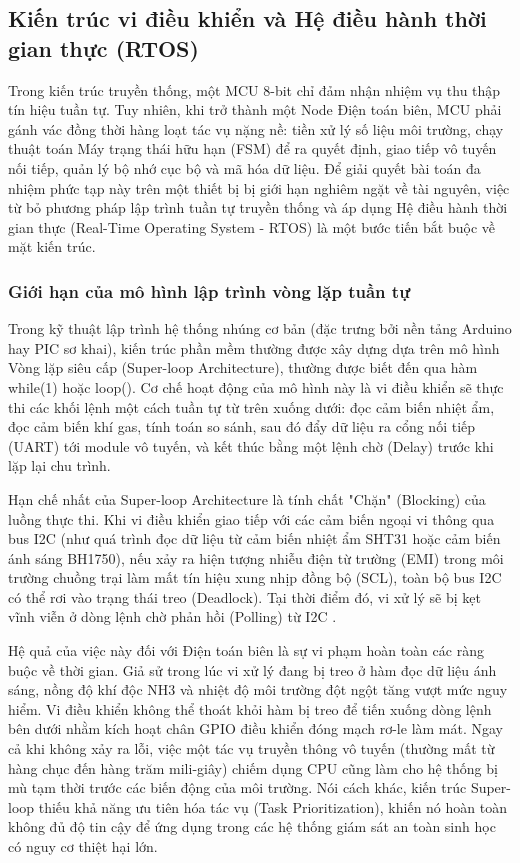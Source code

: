 \subsection{Kiến trúc vi điều khiển và Hệ điều hành thời gian thực (RTOS)}
Trong kiến trúc truyền thống, một MCU 8-bit chỉ đảm nhận nhiệm vụ thu thập tín hiệu tuần tự. Tuy nhiên, khi trở thành một Node Điện toán biên, MCU phải gánh vác đồng thời hàng loạt tác vụ nặng nề: tiền xử lý số liệu môi trường, chạy thuật toán Máy trạng thái hữu hạn (FSM) để ra quyết định, giao tiếp vô tuyến nối tiếp, quản lý bộ nhớ cục bộ và mã hóa dữ liệu. Để giải quyết bài toán đa nhiệm phức tạp này trên một thiết bị bị giới hạn nghiêm ngặt về tài nguyên, việc từ bỏ phương pháp lập trình tuần tự truyền thống và áp dụng Hệ điều hành thời gian thực (Real-Time Operating System - RTOS) là một bước tiến bắt buộc về mặt kiến trúc.
\subsubsection{Giới hạn của mô hình lập trình vòng lặp tuần tự}
Trong kỹ thuật lập trình hệ thống nhúng cơ bản (đặc trưng bởi nền tảng Arduino hay PIC sơ khai), kiến trúc phần mềm thường được xây dựng dựa trên mô hình Vòng lặp siêu cấp (Super-loop Architecture), thường được biết đến qua hàm while(1) hoặc loop(). Cơ chế hoạt động của mô hình này là vi điều khiển sẽ thực thi các khối lệnh một cách tuần tự từ trên xuống dưới: đọc cảm biến nhiệt ẩm, đọc cảm biến khí gas, tính toán so sánh, sau đó đẩy dữ liệu ra cổng nối tiếp (UART) tới module vô tuyến, và kết thúc bằng một lệnh chờ (Delay) trước khi lặp lại chu trình.

Hạn chế nhất của Super-loop Architecture là tính chất "Chặn" (Blocking) của luồng thực thi. Khi vi điều khiển giao tiếp với các cảm biến ngoại vi thông qua bus I2C (như quá trình đọc dữ liệu từ cảm biến nhiệt ẩm SHT31 hoặc cảm biến ánh sáng BH1750), nếu xảy ra hiện tượng nhiễu điện từ trường (EMI) trong môi trường chuồng trại làm mất tín hiệu xung nhịp đồng bộ (SCL), toàn bộ bus I2C có thể rơi vào trạng thái treo (Deadlock). Tại thời điểm đó, vi xử lý sẽ bị kẹt vĩnh viễn ở dòng lệnh chờ phản hồi (Polling) từ I2C \cite{white2011making}.

Hệ quả của việc này đối với Điện toán biên là sự vi phạm hoàn toàn các ràng buộc về thời gian. Giả sử trong lúc vi xử lý đang bị treo ở hàm đọc dữ liệu ánh sáng, nồng độ khí độc NH3 và nhiệt độ môi trường đột ngột tăng vượt mức nguy hiểm. Vi điều khiển không thể thoát khỏi hàm bị treo để tiến xuống dòng lệnh bên dưới nhằm kích hoạt chân GPIO điều khiển đóng mạch rơ-le làm mát. Ngay cả khi không xảy ra lỗi, việc một tác vụ truyền thông vô tuyến (thường mất từ hàng chục đến hàng trăm mili-giây) chiếm dụng CPU cũng làm cho hệ thống bị mù tạm thời trước các biến động của môi trường. Nói cách khác, kiến trúc Super-loop thiếu khả năng ưu tiên hóa tác vụ (Task Prioritization), khiến nó hoàn toàn không đủ độ tin cậy để ứng dụng trong các hệ thống giám sát an toàn sinh học có nguy cơ thiệt hại lớn.


